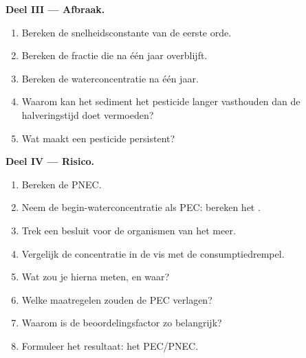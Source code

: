 \begin{problem}
\medskip\noindent\textbf{Deel III --- Afbraak.}
\begin{enumerate}[resume]
  \item Bereken de snelheidsconstante van de eerste orde.
  \item Bereken de fractie die na één jaar overblijft.
  \item Bereken de waterconcentratie na één jaar.
  \item Waarom kan het sediment het pesticide langer vasthouden dan de
        halveringstijd doet vermoeden?
  \item Wat maakt een pesticide persistent?
\end{enumerate}

\medskip\noindent\textbf{Deel IV --- Risico.}
\begin{enumerate}[resume]
  \item Bereken de PNEC.
  \item Neem de begin-waterconcentratie als PEC: bereken het .
  \item Trek een besluit voor de organismen van het meer.
  \item Vergelijk de concentratie in de vis met de consumptiedrempel.
  \item Wat zou je hierna meten, en waar?
  \item Welke maatregelen zouden de PEC verlagen?
  \item Waarom is de beoordelingsfactor zo belangrijk?
  \item Formuleer het resultaat: het  PEC/PNEC.
\end{enumerate}
\end{problem}
